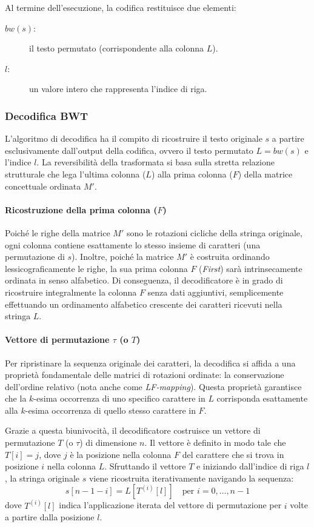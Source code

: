 \noindent Al termine dell'esecuzione, la codifica restituisce due elementi:

\begin{description}
    \item[$bw(s)$:] il testo permutato (corrispondente alla colonna $L$).
    \item[$l$:] un valore intero che rappresenta l'indice di riga.
\end{description}

\subsubsection{Decodifica BWT}
L'algoritmo di decodifica ha il compito di ricostruire il testo originale $s$ a partire esclusivamente dall'output della codifica, ovvero il testo permutato $L = bw(s)$ e l'indice $l$. La reversibilità della trasformata si basa sulla stretta relazione strutturale che lega l'ultima colonna ($L$) alla prima colonna ($F$) della matrice concettuale ordinata $M'$.

\paragraph{Ricostruzione della prima colonna ($F$)}
Poiché le righe della matrice $M'$ sono le rotazioni cicliche della stringa originale, ogni colonna contiene esattamente lo stesso insieme di caratteri (una permutazione di $s$). Inoltre, poiché la matrice $M'$ è costruita ordinando lessicograficamente le righe, la sua prima colonna $F$ (\textit{First}) sarà intrinsecamente ordinata in senso alfabetico.
Di conseguenza, il decodificatore è in grado di ricostruire integralmente la colonna $F$ senza dati aggiuntivi, semplicemente effettuando un ordinamento alfabetico crescente dei caratteri ricevuti nella stringa $L$.

\paragraph{Vettore di permutazione $\tau$ (o $T$)}
Per ripristinare la sequenza originale dei caratteri, la decodifica si affida a una proprietà fondamentale delle matrici di rotazioni ordinate: la conservazione dell'ordine relativo (nota anche come \textit{LF-mapping}). Questa proprietà garantisce che la $k$-esima occorrenza di uno specifico carattere in $L$ corrisponda esattamente alla $k$-esima occorrenza di quello stesso carattere in $F$.

Grazie a questa biunivocità, il decodificatore costruisce un vettore di permutazione $T$ (o $\tau$) di dimensione $n$. Il vettore è definito in modo tale che $T[i] = j$, dove $j$ è la posizione nella colonna $F$ del carattere che si trova in posizione $i$ nella colonna $L$.
Sfruttando il vettore $T$ e iniziando dall'indice di riga $l$, la stringa originale $s$ viene ricostruita iterativamente navigando la sequenza:
\[ s[n-1-i] = L[T^{(i)}[l]] \quad \text{per } i = 0, \dots, n-1 \]
dove $T^{(i)}[l]$ indica l'applicazione iterata del vettore di permutazione per $i$ volte a partire dalla posizione $l$.
